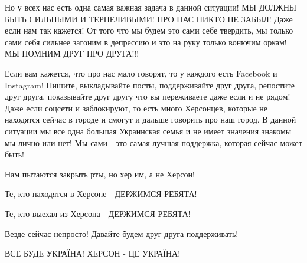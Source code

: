 Но у всех нас есть одна самая важная задача в данной ситуации! МЫ ДОЛЖНЫ БЫТЬ
СИЛЬНЫМИ И ТЕРПЕЛИВЫМИ! ПРО НАС НИКТО НЕ ЗАБЫЛ! Даже если нам так кажется! От
того что мы будем это сами себе твердить, мы только сами себя сильнее загоним в
депрессию и это на руку только вонючим оркам! МЫ ПОМНИМ ДРУГ ПРО ДРУГА!!! 

Если вам кажется, что про нас мало говорят, то у каждого есть Facebook и
Instagram! Пишите, выкладывайте посты, поддерживайте друг друга, репостите друг
друга, показывайте друг другу что вы переживаете даже если и не рядом! Даже
если соцсети и заблокируют, то есть много Херсонцев, которые не находятся
сейчас в городе и смогут и дальше говорить про наш город. В данной ситуации мы
все одна большая Украинская семья и не имеет значения знакомы мы лично или нет!
Мы сами - это самая лучшая поддержка, которая сейчас может быть! 

Нам пытаются закрыть рты, но хер им, а не Херсон!

Те, кто находятся в Херсоне - ДЕРЖИМСЯ РЕБЯТА! 

Те, кто выехал из Херсона - ДЕРЖИМСЯ РЕБЯТА!

Везде сейчас непросто! Давайте будем друг друга поддерживать!

ВСЕ БУДЕ УКРАЇНА! ХЕРСОН - ЦЕ УКРАЇНА!
